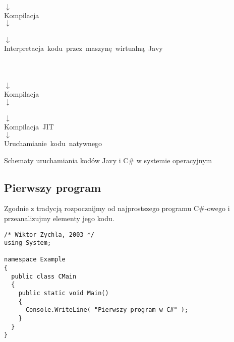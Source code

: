 \begin{table}[ht]
	\begin{center}

	  \\ $\downarrow$ \\
	 \mbox{Kompilacja}                                  \\ $\downarrow$ \\
	  \\ $\downarrow$ \\
	 \mbox{Interpretacja kodu przez maszynę wirtualną Javy} \\ 
         \mbox{}                                                         \\
         \mbox{}                                                         \\
	  \\ $\downarrow$ \\
	 \mbox{Kompilacja}                                  \\ $\downarrow$ \\
	  \\ $\downarrow$ \\
	 \mbox{Kompilacja JIT} \\ $\downarrow$ \\
	 \mbox{Uruchamianie kodu natywnego} 

	\end{center}
\caption{Schematy uruchamiania kodów Javy i C\# w systemie operacyjnym} 
\label{tab:RuntimeLangs}
\end{table}

\subsection{Pierwszy program}

Zgodnie z tradycją rozpocznijmy od najprostszego programu C\#-owego i przeanalizujmy elementy jego kodu.

\begin{scriptsize}
\begin{verbatim}
/* Wiktor Zychla, 2003 */
using System;

namespace Example
{
  public class CMain
  {
    public static void Main()
    {
      Console.WriteLine( "Pierwszy program w C#" );
    }
  }
}
\end{verbatim}
\end{scriptsize}

